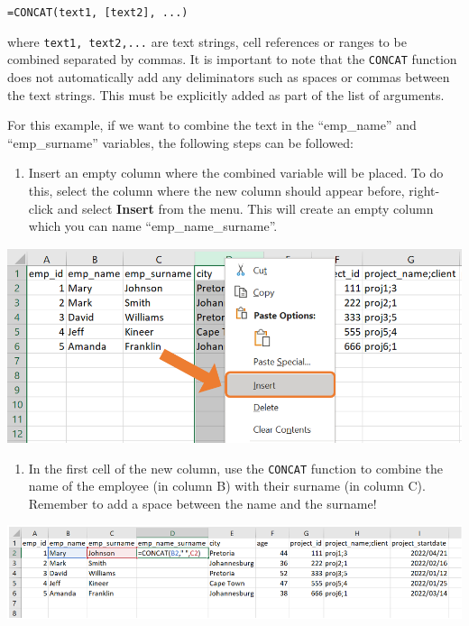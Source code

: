 \documentclass[
]{book}
\providecommand{\tightlist}{%
  \setlength{\itemsep}{0pt}\setlength{\parskip}{0pt}}
\begin{document}
\texttt{=CONCAT(text1,\ {[}text2{]},\ ...)}

where \texttt{text1,\ text2,...} are text strings, cell references or ranges to be combined separated by commas. It is important to note that the \texttt{CONCAT} function does not automatically add any deliminators such as spaces or commas between the text strings. This must be explicitly added as part of the list of arguments.

For this example, if we want to combine the text in the ``emp\_name'' and ``emp\_surname'' variables, the following steps can be followed:

\newpage

\begin{enumerate}
\def\labelenumi{\arabic{enumi}.}
\tightlist
\item
  Insert an empty column where the combined variable will be placed. To do this, select the column where the new column should appear before, right-click and select \textbf{Insert} from the menu. This will create an empty column which you can name ``emp\_name\_surname''.
\end{enumerate}

\begin{center}\includegraphics[width=0.6\linewidth]{Figures/combine_2} \end{center}

\begin{enumerate}
\def\labelenumi{\arabic{enumi}.}
\setcounter{enumi}{1}
\tightlist
\item
  In the first cell of the new column, use the \texttt{CONCAT} function to combine the name of the employee (in column B) with their surname (in column C). Remember to add a space between the name and the surname!
\end{enumerate}

\begin{center}\includegraphics[width=0.8\linewidth]{Figures/combine_3} \end{center}
\end{document}
